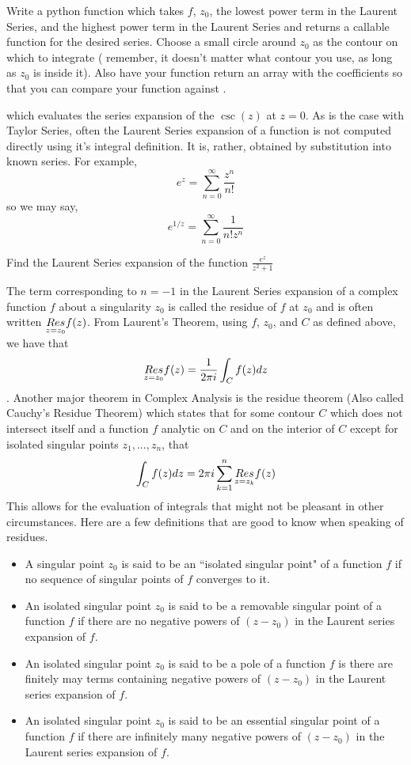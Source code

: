 \begin{problem}
Write a python function which takes $f$, $z_0$, the lowest power term in the Laurent Series, and the highest power term in the Laurent Series and returns a callable function for the desired series. Choose a small circle around $z_0$ as the contour on which to integrate ( remember, it doesn't matter what contour you use, as long as $z_0$ is inside it). Also have your function return an array with the coefficients so that you can compare your function against .
\end{problem}

which evaluates the series expansion of the $\csc(z)$ at $z=0$. 
As is the case with Taylor Series, often the Laurent Series expansion of a function is not computed directly using it's integral definition.
It is, rather, obtained by substitution into known series.
For example, 
$$e^z = \sum_{n=0}^{\infty} \frac{z^n}{n!}$$ so we may say,
$$e^{1/z} = \sum_{n=0}^{\infty} \frac{1}{n! z^n}$$

\begin{problem}
Find the Laurent Series expansion of the function $\frac{e^{z}}{z^2 +1}$
\end{problem}

The term corresponding to $n=-1$ in the Laurent Series expansion of a complex function $f$ about a singularity $z_0$ is called the residue of $f$ at $z_0$ and is often written $\underset{z=z_0}{Res} f(z)$.
From Laurent's Theorem, using $f$, $z_0$, and $C$ as defined above, we have that $$\underset{z=z_0}{Res} f(z) = \frac{1}{2 \pi i} \int_C f(z) dz$$.
Another major theorem in Complex Analysis is the residue theorem (Also called Cauchy's Residue Theorem) which states that for some contour $C$ which does not intersect itself and a function $f$ analytic on $C$ and on the interior of $C$ except for isolated singular points $z_1,...,z_n$, that 
$$\int_C f(z) dz = 2 \pi i \sum_{k=1}^{n} \underset{z=z_k}{Res} f(z)$$
This allows for the evaluation of integrals that might not be pleasant in other circumstances.
Here are a few definitions that are good to know when speaking of residues.
\begin{itemize}
\item A singular point $z_0$ is said to be an ``isolated singular point" of a function $f$ if no sequence of singular points of $f$ converges to it.
\item An isolated singular point $z_0$ is said to be a removable singular point of a function $f$ if there are no negative powers of $(z-z_0)$ in the Laurent series expansion of $f$.
\item An isolated singular point $z_0$ is said to be a pole of a function $f$ is there are finitely may terms containing negative powers of $(z-z_0)$ in the Laurent series expansion of $f$. 
\item An isolated singular point $z_0$ is said to be an essential singular point of a function $f$ if there are infinitely many negative powers of $(z-z_0)$ in the Laurent series expansion of $f$.
\end{itemize}

